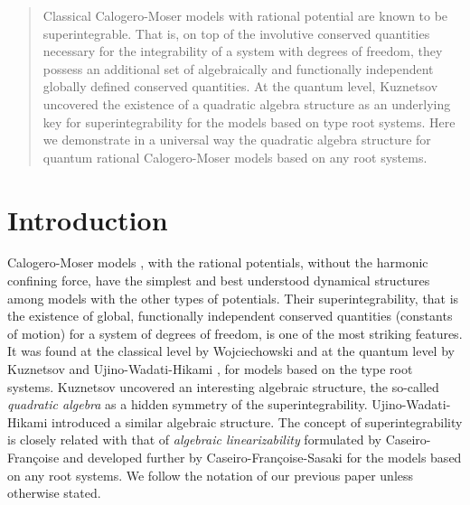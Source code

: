 \documentclass[a4paper,12pt]{article}
\begin{document}
\preprint
\thispagestyle{empty}
\bigskip
\bigskip
\bigskip


\Author

\Address
\vspace{1cm}

\begin{abstract}
Classical Calogero-Moser models with rational potential are known to be
superintegrable. That is, on top of the
\coordHE{} involutive conserved quantities necessary for the integrability of
a system with \coordHE{}  degrees of freedom, they possess an additional
set of  \coordHE{} algebraically and functionally
independent globally defined conserved quantities.
At the quantum level, Kuznetsov uncovered the existence of
a quadratic algebra structure as an
underlying key for superintegrability for the models based on
\coordHE{} type root systems. Here we demonstrate in a universal way
the quadratic algebra structure
for quantum rational Calogero-Moser models based on any root systems.
\end{abstract}
\bigskip
\bigskip
\bigskip

\section{Introduction}
\label{intro}
\setcounter{equation}{0}

Calogero-Moser models \cite{Cal, Sut},
\cite{CalMo} with the rational potentials, without the
harmonic confining force,
have the simplest and  best understood dynamical structures among
models with the other types of potentials.
Their superintegrability, that is the existence of
\coordHE{} global, functionally independent conserved quantities
(constants of motion) for a system of \coordHE{} degrees of freedom,
is one of the most striking features. It was found  at the classical
level by Wojciechowski
\cite{Woj} and at the quantum level by Kuznetsov \cite{Kuz}
and Ujino-Wadati-Hikami \cite{UjWa},
for models based on the \coordHE{} type root systems.
Kuznetsov \cite{Kuz} uncovered an interesting algebraic structure,
the so-called {\em quadratic algebra\/}
as a hidden symmetry of the superintegrability.
Ujino-Wadati-Hikami \cite{UjWa} introduced a similar algebraic structure.
The concept of superintegrability is closely related with that of
{\em algebraic linearizability\/} formulated by Caseiro-Fran\c{c}oise
\cite{cf} and developed further by Caseiro-Fran\c{c}oise-Sasaki
\cite{cfs} for the models based on any root systems.
We follow the notation of our previous paper unless otherwise stated.
\end{document}
